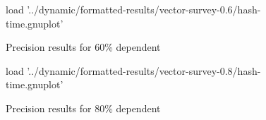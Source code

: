 \begin{figure}[H]
	\centering
	\begin{gnuplot}[terminal=pdf]
	load '../dynamic/formatted-results/vector-survey-0.6/hash-time.gnuplot'
	\end{gnuplot}
	\caption{Precision results for 60\% dependent}
	\label{chart:time-0.6-hash}
\end{figure}

\begin{figure}[H]
	\centering
	\begin{gnuplot}[terminal=pdf]
	load '../dynamic/formatted-results/vector-survey-0.8/hash-time.gnuplot'
	\end{gnuplot}
	\caption{Precision results for 80\% dependent}
	\label{chart:time-0.8-hash}
\end{figure}